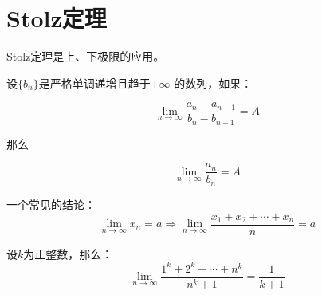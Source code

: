 \section{Stolz定理}

Stolz定理是上、下极限的应用。

\begin{theorem}
	设$\{b_n\}$是严格单调递增且趋于$+\infty$ 的数列，如果：
	
	$$
	\lim_{n\rightarrow \infty} \frac{a_n - a_{n-1}}{b_n - b_{n-1}} = A
	$$
	
\noindent	那么

	$$
	\lim_{n\rightarrow \infty} \frac{a_n}{b_n} = A
	$$
\end{theorem}


\begin{example} 一个常见的结论：
	$$
	\lim_{n\rightarrow \infty} x_n=a \Rightarrow \lim_{n\rightarrow \infty} \frac{x_1 + x_2 + \cdots + x_n}{n} = a
	$$
\end{example}

\begin{example}
	设$k$为正整数，那么：
	$$
	\lim_{n\rightarrow \infty} \frac{1^k + 2 ^ k + \cdots + n ^ k}{n^k+1} = \frac{1}{k+1}
	$$
\end{example}











